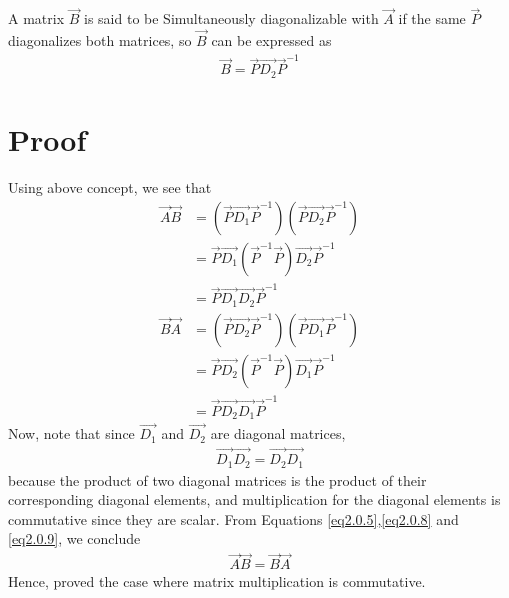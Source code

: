 \documentclass[journal,12pt,twocolumn]{IEEEtran}
\begin{document}
A matrix $\vec{B}$ is said to be Simultaneously diagonalizable with $\vec{A}$ if the same $\vec{P}$ diagonalizes both matrices, so $\vec{B}$ can be expressed as
\begin{align}\label{eq2}
    \vec{B} = \vec{P}\vec{D_2}\vec{P}^{-1}
\end{align}
\section{Proof}
Using above concept, we see that
\begin{align}
    \vec{A}\vec{B} & = (\vec{P}\vec{D_1}\vec{P}^{-1})(\vec{P}\vec{D_2}\vec{P}^{-1})\\& =\vec{P}\vec{D_1}(\vec{P}^{-1}\vec{P})\vec{D_2}\vec{P}^{-1}\\& = \label{eq2.0.5} \vec{P}\vec{D_1}\vec{D_2}\vec{P}^{-1}
\end{align}
\begin{align}
    \vec{B}\vec{A} & = (\vec{P}\vec{D_2}\vec{P}^{-1})(\vec{P}\vec{D_1}\vec{P}^{-1})\\& =\vec{P}\vec{D_2}(\vec{P}^{-1}\vec{P})\vec{D_1}\vec{P}^{-1}\\& = \label{eq2.0.8} \vec{P}\vec{D_2}\vec{D_1}\vec{P}^{-1}
\end{align}
Now, note that since $\vec{D_1}$ and $\vec{D_2}$ are diagonal matrices,
\begin{align}\label{eq2.0.9}
    \vec{D_1}\vec{D_2} = \vec{D_2}\vec{D_1}
\end{align}
because the product of two diagonal matrices is the product of their corresponding diagonal elements, and multiplication for the diagonal elements is commutative since they are scalar.
From Equations \eqref{eq2.0.5},\eqref{eq2.0.8} and \eqref{eq2.0.9}, we conclude
\begin{align}
    \vec{A}\vec{B} = \vec{B}\vec{A}
\end{align}
Hence, proved the case where matrix multiplication is commutative.
\end{document}
